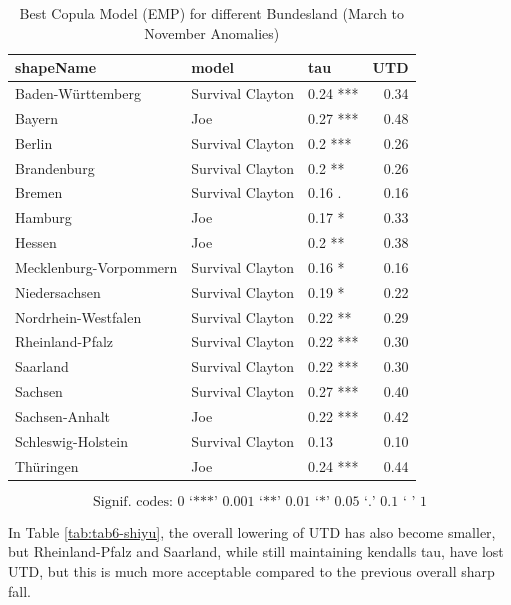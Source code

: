 \documentclass[
]{krantz}
\begin{document}
\begin{table}

\caption{\label{tab:tab5-shiyu}Best Copula Model (EMP) for different Bundesland (March to November Anomalies)}
\centering
\begin{tabular}[t]{l|l|l|r}
\hline
shapeName & model & tau & UTD\\
\hline
Baden-Württemberg & Survival Clayton & 0.24 *** & 0.34\\
\hline
Bayern & Joe & 0.27 *** & 0.48\\
\hline
Berlin & Survival Clayton & 0.2 *** & 0.26\\
\hline
Brandenburg & Survival Clayton & 0.2 ** & 0.26\\
\hline
Bremen & Survival Clayton & 0.16 . & 0.16\\
\hline
Hamburg & Joe & 0.17 * & 0.33\\
\hline
Hessen & Joe & 0.2 ** & 0.38\\
\hline
Mecklenburg-Vorpommern & Survival Clayton & 0.16 * & 0.16\\
\hline
Niedersachsen & Survival Clayton & 0.19 * & 0.22\\
\hline
Nordrhein-Westfalen & Survival Clayton & 0.22 ** & 0.29\\
\hline
Rheinland-Pfalz & Survival Clayton & 0.22 *** & 0.30\\
\hline
Saarland & Survival Clayton & 0.22 *** & 0.30\\
\hline
Sachsen & Survival Clayton & 0.27 *** & 0.40\\
\hline
Sachsen-Anhalt & Joe & 0.22 *** & 0.42\\
\hline
Schleswig-Holstein & Survival Clayton & 0.13 & 0.10\\
\hline
Thüringen & Joe & 0.24 *** & 0.44\\
\hline
\end{tabular}
\end{table}

\[\text{Signif. codes: 0 ‘***’ 0.001 ‘**’ 0.01 ‘*’ 0.05 ‘.’ 0.1 ‘ ’ 1}\]

In Table \ref{tab:tab6-shiyu}, the overall lowering of UTD has also become smaller, but Rheinland-Pfalz and Saarland, while still maintaining kendalls tau, have lost UTD, but this is much more acceptable compared to the previous overall sharp fall.
\end{document}
